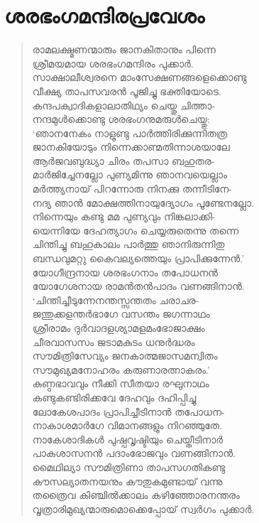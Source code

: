 \section{ശരഭംഗമന്ദിരപ്രവേശം}

\begin{verse}
രാമലക്ഷ്മണന്മാരും ജാനകിതാനും പിന്നെ\\
ശ്രീമയമായ ശരഭംഗമന്ദിരം പുക്കാര്‍.\\
സാക്ഷാലീശ്വരനെ മാംസേക്ഷണങ്ങളെക്കൊണ്ടു\\
വീക്ഷ്യ താപസവരന്‍ പൂജിച്ചു ഭക്തിയോടെ.\\
കന്ദപക്വാദികളാലാതിഥ്യം ചെയ്തു ചിത്താ-\\
നന്ദമുള്‍ക്കൊണ്ടു ശരഭംഗനുമരുള്‍ചെയ്തു:\\
‘ഞാനനേകം നാളുണ്ടു പാര്‍ത്തിരിക്കുന്നിതത്ര\\
ജാനകിയോടും നിന്നെക്കാണ്മതിന്നാശയാലേ\\
ആര്‍ജവബുദ്ധ്യാ ചിരം തപസാ ബഹുതര-\\
മാര്‍ജിച്ചേനല്ലോ പുണ്യമിന്നു ഞാനവയെല്ലാം\\
മര്‍ത്ത്യനായ് പിറന്നോരു നിനക്കു തന്നീടിനേ-\\
നദ്യ ഞാന്‍ മോക്ഷത്തിനായുദ്യോഗം പൂണ്ടേനല്ലോ.\\
നിന്നെയും കണ്ടു മമ പുണ്യവും നിങ്കലാക്കി-\\
യെന്നിയേ ദേഹത്യാഗം ചെയ്യരുതെന്നു തന്നെ\\
ചിന്തിച്ചു ബഹുകാലം പാര്‍ത്തു ഞാനിരുന്നിതു\\
ബന്ധവുമറ്റു കൈവല്യത്തെയും പ്രാപിക്കുന്നേന്‍.’\\
യോഗീന്ദ്രനായ ശരഭംഗനാം തപോധനന്‍\\
യോഗേശനായ രാമന്‍തന്‍പാദം വണങ്ങിനാന്‍.\\
‘ചിന്തിച്ചീടുന്നേനന്തസ്സന്തതം ചരാചര-\\
ജന്തുക്കളന്തര്‍ഭാഗേ വസന്തം ജഗന്നാഥം\\
ശ്രീരാമം ദുര്‍വാദളശ്യാമളമംഭോജാക്ഷം\\
ചീരവാസസം ജടാമകുടം ധനുര്‍ദ്ധരം\\
സൗമിത്രിസേവ്യം ജനകാത്മജാസമന്വിതം\\
സൗമുഖ്യമനോഹരം കരുണാരത്നാകരം.’\\
കുണ്ഠഭാവവും നീക്കി സീതയാ രഘുനാഥം\\
കണ്ടുകണ്ടിരിക്കവേ ദേഹവും ദഹിപ്പിച്ചു\\
ലോകേശപാദം പ്രാപിച്ചീടിനാന്‍ തപോധന-\\
നാകാശമാര്‍ഗേ വിമാനങ്ങളും നിറഞ്ഞുതേ.\\
നാകേശാദികള്‍ പുഷ്പവൃഷ്ടിയും ചെയ്തീടിനാര്‍\\
പാകശാസനന്‍ പദാംഭോജവും വണങ്ങിനാന്‍.\\
മൈഥില്യാ സൗമിത്രിണാ താപസഗതികണ്ടു\\
കൗസല്യാതനയനും കൗതുകമുണ്ടായ് വന്നു\\
തത്രൈവ കിഞ്ചില്‍ക്കാലം കഴിഞ്ഞോരനന്തരം\\
വൃത്രാരിമുഖ്യന്മാരുമൊക്കെപ്പോയ് സ്വര്‍ഗം പുക്കാര്‍.
\end{verse}

